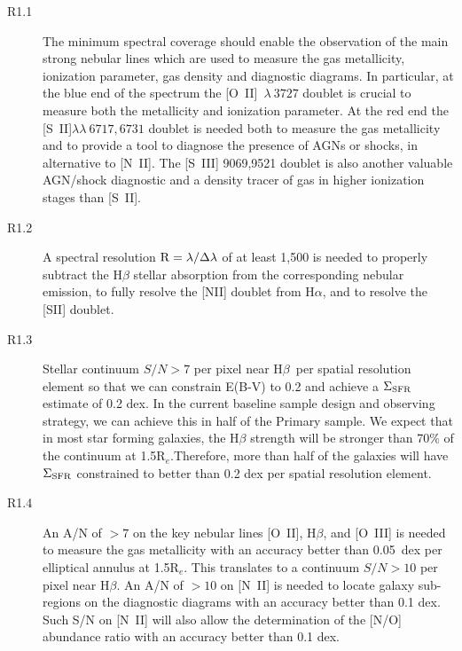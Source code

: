 \documentclass[preprint,11pt]{aastex}
\newcommand{\Hbeta}{{H$\beta$}}
\newcommand{\Reff}{{R$_{e}$}}
\begin{document}
\begin{description}

\item [R1.1] The minimum spectral coverage should enable the
  observation of the main strong nebular lines which are used to
  measure the gas metallicity, ionization parameter, gas density and
  diagnostic diagrams.  In particular, at the blue end of the spectrum
  the [O~II]~$\lambda~3727$ doublet is crucial to measure both the
  metallicity and ionization parameter.  At the red end the
  [S~II]$\lambda\lambda~6717,6731$ doublet is needed both to measure
  the gas metallicity and to provide a tool to diagnose the presence
  of AGNs or shocks, in alternative to [N~II]. The [S~III] 9069,9521
  doublet is also another valuable AGN/shock diagnostic
  \citep{osterbrock92} and a density tracer of gas in higher
  ionization stages than [S~II].

\item [R1.2] A spectral resolution $\rm R=\lambda/\Delta \lambda$ of
  at least 1,500 is needed to properly subtract the H$\beta$ stellar
  absorption from the corresponding nebular emission, to fully resolve
  the [NII] doublet from H$\alpha$, and to resolve the [SII] doublet.

\item [R1.3] Stellar continuum $S/N > 7$ per pixel near \Hbeta\ per
  spatial resolution element so that we can constrain E(B-V) to 0.2
  and achieve a ${\rm \Sigma_{SFR}}$ estimate of 0.2 dex. In the
  current baseline sample design and observing strategy, we can
  achieve this in half of the Primary sample. We expect that in most
  star forming galaxies, the H$\beta$ strength will be stronger than
  70\% of the continuum at 1.5\Reff.Therefore, more than half of the
  galaxies will have ${\rm \Sigma_{SFR}}$ constrained to better than
  0.2 dex per spatial resolution element.

\item [R1.4] An A/N of $>7$ on the key nebular lines [O~II], H$\beta$, and
  [O~III] is needed to measure the gas metallicity with an accuracy
  better than 0.05~dex per elliptical annulus at 1.5\Reff. This translates
  to a continuum $S/N > 10$ per pixel near \Hbeta.
  An A/N of $>10$ on [N~II] is needed to locate galaxy sub-regions on the
  diagnostic diagrams with an accuracy better than 0.1 dex. Such S/N
  on [N~II] will also allow the determination of the [N/O] abundance
  ratio with an accuracy better than 0.1 dex.  %


\end{description}
\end{document}
